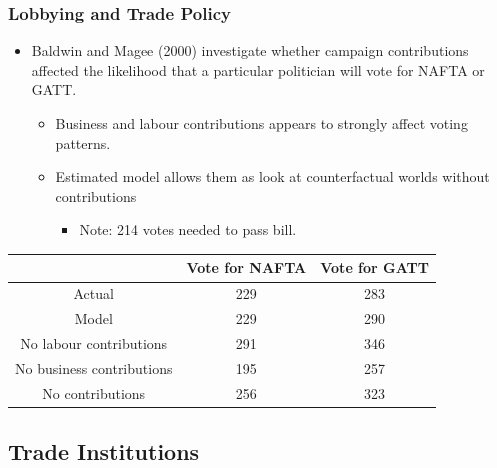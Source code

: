 \documentclass{beamer}
\begin{document}
\begin{frame}
	\frametitle{Lobbying and Trade Policy}
	
	\begin{itemize}
	\item Baldwin and Magee (2000) investigate whether campaign contributions affected the likelihood that a particular politician will vote for NAFTA or GATT.
		\begin{itemize}
			\item Business and labour contributions appears to strongly affect voting patterns.
			\item Estimated model allows them as look at counterfactual worlds without contributions
				\begin{itemize}
					\item Note: 214 votes needed to pass bill.
				\end{itemize}
		\end{itemize}
	\end{itemize}
\begin{center}
\begin{tabular}{c c c }
\hline
	& Vote for NAFTA & Vote for GATT  \\			
	\hline
	Actual & 229 & 283  \\
	Model	& 229	& 290  \\
	No labour contributions & 291 & 346 \\
	No business contributions	& 195 & 257  \\
	No contributions & 256 & 323 \\
	\hline
\end{tabular}
\end{center}

\end{frame}

\subsection{Trade Institutions}
\end{document}
